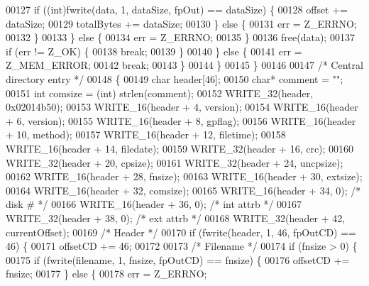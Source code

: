 \begin{DoxyCode}
00127                 \textcolor{keywordflow}{if} ((\textcolor{keywordtype}{int})fwrite(data, 1, dataSize, fpOut) == dataSize) \{
00128                   offset += dataSize;
00129                   totalBytes += dataSize;
00130                 \} \textcolor{keywordflow}{else} \{
00131                   err = Z\_ERRNO;
00132                 \}
00133               \} \textcolor{keywordflow}{else} \{
00134                 err = Z\_ERRNO;
00135               \}
00136               free(data);
00137               \textcolor{keywordflow}{if} (err != Z\_OK) \{
00138                 \textcolor{keywordflow}{break};
00139               \}
00140             \} \textcolor{keywordflow}{else} \{
00141               err = Z\_MEM\_ERROR;
00142               \textcolor{keywordflow}{break};
00143             \}
00144           \}
00145         \}
00146 
00147         \textcolor{comment}{/* Central directory entry */}
00148         \{
00149           \textcolor{keywordtype}{char} header[46];
00150           \textcolor{keywordtype}{char}* comment = \textcolor{stringliteral}{""};
00151           \textcolor{keywordtype}{int} comsize = (int) strlen(comment);
00152           WRITE\_32(header, 0x02014b50);
00153           WRITE\_16(header + 4, version);
00154           WRITE\_16(header + 6, version);
00155           WRITE\_16(header + 8, gpflag);
00156           WRITE\_16(header + 10, method);
00157           WRITE\_16(header + 12, filetime);
00158           WRITE\_16(header + 14, filedate);
00159           WRITE\_32(header + 16, crc);
00160           WRITE\_32(header + 20, cpsize);
00161           WRITE\_32(header + 24, uncpsize);
00162           WRITE\_16(header + 28, fnsize);
00163           WRITE\_16(header + 30, extsize);
00164           WRITE\_16(header + 32, comsize);
00165           WRITE\_16(header + 34, 0);     \textcolor{comment}{/* disk # */}
00166           WRITE\_16(header + 36, 0);     \textcolor{comment}{/* int attrb */}
00167           WRITE\_32(header + 38, 0);     \textcolor{comment}{/* ext attrb */}
00168           WRITE\_32(header + 42, currentOffset);
00169           \textcolor{comment}{/* Header */}
00170           \textcolor{keywordflow}{if} (fwrite(header, 1, 46, fpOutCD) == 46) \{
00171             offsetCD += 46;
00172 
00173             \textcolor{comment}{/* Filename */}
00174             \textcolor{keywordflow}{if} (fnsize > 0) \{
00175               \textcolor{keywordflow}{if} (fwrite(filename, 1, fnsize, fpOutCD) == fnsize) \{
00176                 offsetCD += fnsize;
00177               \} \textcolor{keywordflow}{else} \{
00178                 err = Z\_ERRNO;

\end{DoxyCode}
